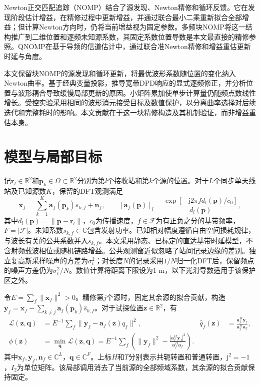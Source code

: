 \documentclass[a4paper,12pt,review]{cas-sc}
\newcommand{\R}{\mathbb R}
\newcommand{\C}{\mathbb C}
\begin{document}
Newton正交匹配追踪（NOMP）结合了源发现、Newton精修和循环反馈\cite{Mamandipoor2016}。它在发现阶段估计增益，在精修过程中更新增益，并通过联合最小二乘重新拟合全部增益；但计算Newton方向时，仍将当前增益视为固定参数。多频块NOMP将这一结构推广到二维位置和逐频未知源系数\cite{Yang2022}，其固定系数位置导数是本文最直接的精修参照。QNOMP在基于导频的信道估计中，通过联合准Newton精修和增益重估更新时延与角度\cite{Zeng2025}。

本文保留块NOMP的源发现和循环更新，将最优波形系数随位置的变化纳入Newton曲率。基于经典变量投影\cite{GolubPereyra1973}，推导宽带DPD响应的显式逐频修正，并分析位置与波形耦合导致缓慢局部更新的原因。小矩阵累加使单步计算量仍随频点数线性增长。受控实验采用相同的波形消元接受目标及数值保护，以分离曲率选择对后续迭代和完整耗时的影响。本文贡献在于这一块精修构造及其机制验证，而非增益重估本身。

\section{模型与局部目标}
记$\bm r_l\in\R^2$和$\bm p_k\in\Omega\subset\R^2$分别为第$l$个接收站和第$k$个源的位置。对于$L$个同步单天线站及已知源数$K$，保留的DFT观测满足
\begin{equation}
 \bm x_f=\sum_{k=1}^K\bm a_f(\bm p_k)s_{k,f}+\bm n_f,
 \qquad [\bm a_f(\bm p)]_l=\frac{\exp[-\mathrm j2\pi f d_l(\bm p)/c_0]}{d_l(\bm p)},
 \label{eq:model}
\end{equation}
其中$d_l(\bm p)=\|\bm p-\bm r_l\|$，$c_0$为传播速度，$f\in\mathcal F$为有正负之分的基带频率，$F=|\mathcal F|$。未知系数$s_{k,f}\in\C$包含发射功率。已知相对幅度遵循自由空间损耗规律，与波长有关的公共系数并入$s_{k,f}$\cite{ITURP5252024}。本文采用静态、已标定的直达基带时延模型，不含射频载波相位或随机链路增益。公共观测窗近似忽略了站间记录边缘的差别\cite{ChenHudsonYao2002}。独立复高斯采样噪声的方差为$\sigma_t^2$；对长度$N$的记录采用$1/N$归一化DFT后，保留频点的噪声方差仍为$\sigma_t^2/N$。数值计算将距离下限设为1 m，以下光滑导数适用于该保护区之外。

令$E=\sum_f\|\bm x_f\|^2>0$。精修第$j$个源时，固定其余源的拟合贡献，构造$\bm y_f=\bm x_f-\sum_{k\ne j}\bm a_f(\bm p_k)\widehat s_{k,f}$。对于试探位置$\bm z\in\R^2$，有
\begin{align}
 \mathcal L(\bm z,\bm q)&=E^{-1}\sum_f\|\bm y_f-\bm a_f(\bm z)q_f\|^2,
 &\widehat q_f(\bm z)&=\frac{\bm a_f^H\bm y_f}{\bm a_f^H\bm a_f},\label{eq:ls}\\
 \phi(\bm z)&=\min_{\bm q}\mathcal L(\bm z,\bm q)
 =E^{-1}\sum_f\left(\|\bm y_f\|^2-\frac{|\bm a_f^H\bm y_f|^2}{\bm a_f^H\bm a_f}\right).
 \label{eq:profile}
\end{align}
其中$\bm x_f,\bm y_f,\bm n_f\in\C^L$，$\bm q\in\C^F$。上标$H$和$T$分别表示共轭转置和普通转置，$\mathrm j^2=-1$，$I_2$为单位矩阵。该局部调用消去了当前源的全部频域系数，其余源的拟合贡献保持固定。
\end{document}
